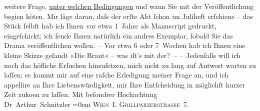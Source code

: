 \begin{ledgroupsized}[t]{13cm}
               weitere Frage, \uline{unter welchen Bedingungen}{ }{\pb}und wann Sie mit der Veröffentlichung begi{\geminationn}en kö{\geminationn}ten. Mir läge daran,
               daſs der erſte Akt ſchon im Juliheft erſchiene – das Stück ſelbſt hab ich  Ihnen vor etwa 1 Jahre als Manuscript gedruckt,
               eingeſchickt; ich ſende Ihnen natürlich ein andres Exemplar, ſobald Sie das Drama
               veröffentlichen wollen. –\pend
           \pstart
           Vor etwa 6 oder 7 Wochen hab {\pb}ich Ihnen eine kleine Skizze
               geſandt »Die Braut« – was iſt’s mit der? –\pend
           \pstart
           – Jedenfalls will ich noch das höfliche Erſuchen hinzuſetzen, mich nicht zu lang auf
               Antwort warten zu laſſen; es kommt mir auf eine raſche Erledigung meiner Frage an,
               und ich appellire an Ihre Liebenswürdigkeit, mir Ihre Entſcheidung in möglichſt
               kurzer Zeit zu{\pb}ko{\geminationm}en zu
               laſſen.\pend
           \pstart
           Mit beſondrer Hochachtung{\\[\baselineskip]}\spacefill\mbox{Dr Arthur Schnitzler}\pend
           \leftskip=0em{}\pstart
           \noindent{}\textsc{Wien I. Grillparzerstraße 7}.\pend
           
         
         \endnumbering{}\end{ledgroupsized}  \newcommand{\dateiname}{L00215}\newcommand{\titel}{Arthur Schnitzler an Wilhelm Bölsche, 1. 6. 1893}\newcommand{\editorInnen}{Martin Anton Müller und Gerd-Hermann Susen}
      